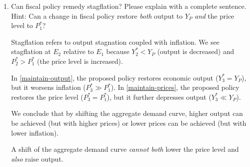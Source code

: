 \documentclass{assignment}
\begin{document}
\begin{enumerate}
\begin{solution}
\end{solution}

\item Can fiscal policy remedy stagflation? Please explain with a complete sentence.  \\ {\footnotesize Hint: Can a change in fiscal policy restore \emph{both} output to $Y_P$ \emph{and} the price level to $P^*_1$?}

\begin{solution}
Stagflation refers to output stagnation coupled with inflation. We see stagflation at $E_2$ relative to $E_1$ because $Y^*_2<Y_P$ (output is decreased) and $P^*_2>P^*_1$ (the price level is increased).

In \cref{maintain-output}, the proposed policy restores economic output ($Y^*_3=Y_P$), but it worsens inflation ($P^*_3 \gg P^*_1$). In \cref{maintain-prices}, the proposed policy restores the price level ($P^*_3=P^*_1$), but it further depresses output ($Y^*_3 \ll Y_P$).

We conclude that by shifting the aggregate demand curve, higher output can be achieved (but with higher prices) or lower prices can be achieved (but with lower inflation).

A shift of the aggregate demand curve \emph{cannot both} lower the price level and \emph{also} raise output.
\end{solution}

\end{enumerate}
\end{document}
